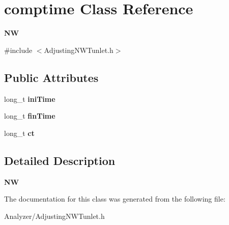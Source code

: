 \hypertarget{structcomptime}{\section{comptime Class Reference}
\label{structcomptime}
}


{\bfseries N\-W}  




{\ttfamily \#include $<$Adjusting\-N\-W\-Tunlet.\-h$>$}

\subsection*{Public Attributes}
\begin{DoxyCompactItemize}
\item 
\hypertarget{structcomptime_a1e095d0f39d14eb21047b696461aeabe}{long\-\_\-t {\bfseries ini\-Time}}\label{structcomptime_a1e095d0f39d14eb21047b696461aeabe}

\item 
\hypertarget{structcomptime_ab76589de547af4cee2ef904541f95c1a}{long\-\_\-t {\bfseries fin\-Time}}\label{structcomptime_ab76589de547af4cee2ef904541f95c1a}

\item 
\hypertarget{structcomptime_aa0afce9596b04068597be6bee7bbd7c0}{long\-\_\-t {\bfseries ct}}\label{structcomptime_aa0afce9596b04068597be6bee7bbd7c0}

\end{DoxyCompactItemize}


\subsection{Detailed Description}
{\bfseries N\-W} 

The documentation for this class was generated from the following file\-:\begin{DoxyCompactItemize}
\item 
Analyzer/Adjusting\-N\-W\-Tunlet.\-h\end{DoxyCompactItemize}
